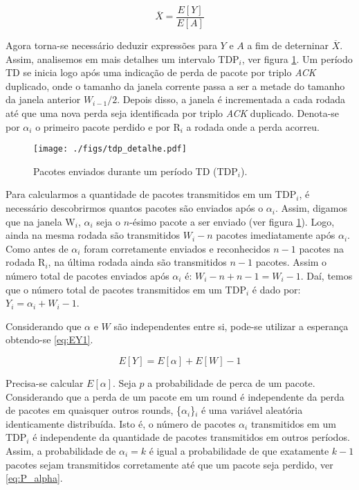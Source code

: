 \begin{equation} \label{eq:throughput}
\overline{X}=\frac{E[Y]}{E[A]}
\end{equation}

Agora torna-se necessário deduzir expressões para $Y$ e $A$ a fim de deterninar $\overline{X}$. Assim, 
analisemos em mais detalhes um intervalo TDP$_i$, ver figura \ref{fig:tdp_detalhe}.
Um período TD se inicia logo após uma indicação de perda de pacote por triplo \textit{ACK} duplicado, 
onde o tamanho da janela corrente passa a ser a metade do tamanho da janela anterior $W_{i-1} / 2$. 
Depois disso, a janela é incrementada a cada rodada até que uma nova perda seja identificada por triplo 
\textit{ACK} duplicado. Denota-se por $\alpha_i$ o primeiro pacote perdido e por R$_i$ a rodada onde a 
perda acorreu. 

\begin{figure}[ht]
  \centering
  \texttt{[image: ./figs/tdp\_detalhe.pdf]}
  \caption{Pacotes enviados durante um período TD (TDP$_{i}$).}
  \label{fig:tdp_detalhe}
\end{figure}

Para calcularmos a quantidade de pacotes transmitidos em um TDP$_i$, é necessário descobrirmos quantos pacotes
são enviados após o $\alpha_i$. Assim, digamos que na janela W$_i$, $\alpha_i$ seja o $n$-ésimo pacote a ser
enviado (ver figura \ref{fig:tdp_detalhe}). Logo, ainda na mesma rodada  são transmitidos $W_i - n$ pacotes 
imediatamente após $\alpha_i$. Como antes de $\alpha_i$ foram corretamente enviados e reconhecidos $n - 1$ pacotes 
na rodada R$_i$, na última rodada ainda são transmitidos $n - 1$ pacotes. Assim o número total de pacotes enviados
após $\alpha_i$ é: $W_i - n + n -1 = W_i - 1$. Daí, temos que o número total de pacotes transmitidos em um
TDP$_i$ é dado por: $Y_i = \alpha_i + W_i - 1$. 

Considerando que $\alpha$ e $W$ são independentes entre si,
pode-se utilizar a esperança obtendo-se \eqref{eq:EY1}.

\begin{equation} \label{eq:EY1}
E[Y]=E[\alpha] + E[W] - 1
\end{equation}

Precisa-se calcular $E[\alpha]$. Seja $p$ a probabilidade de perca de um pacote. Considerando que a perda 
de um pacote em um round é independente da perda de pacotes em quaisquer outros rounds, \{$\alpha_i$\}$_i$ 
é uma variável aleatória identicamente distribuída. Isto é, o número de pacotes $\alpha_i$ transmitidos 
em um TDP$_i$ é independente da quantidade de pacotes transmitidos em outros períodos. Assim, a 
probabilidade de $\alpha_i = k$ é igual a probabilidade de que exatamente $k - 1$ pacotes sejam 
transmitidos corretamente até que um pacote seja perdido, ver \eqref{eq:P_alpha}.


